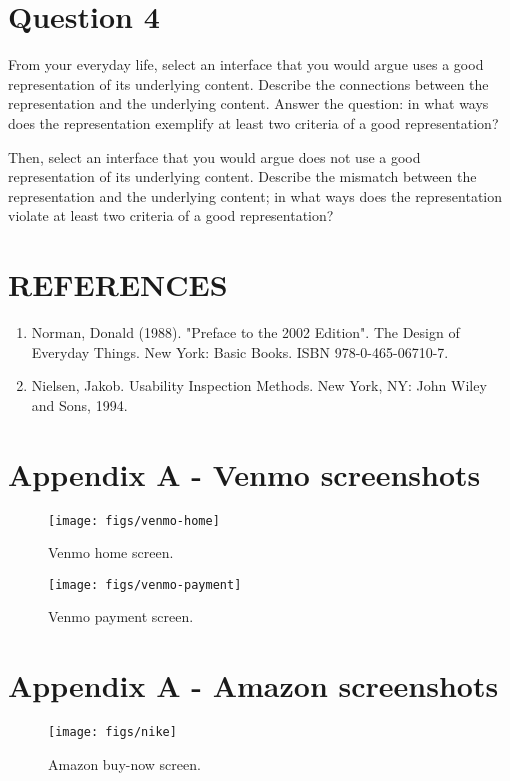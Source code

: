 \section{Question 4}

From your everyday life, select an interface that you would argue uses a good representation of its underlying content. Describe the connections between the representation and the underlying content. Answer the question: in what ways does the representation exemplify at least two criteria of a good representation?

Then, select an interface that you would argue does not use a good representation of its underlying content. Describe the mismatch between the representation and the underlying content; in what ways does the representation violate at least two criteria of a good representation?

\section{REFERENCES}

\begin{enumerate}
\item
  Norman, Donald (1988). "Preface to the 2002 Edition". The Design of Everyday Things. New York: Basic Books. ISBN 978-0-465-06710-7.
\item
  Nielsen, Jakob. Usability Inspection Methods. New York, NY: John Wiley and Sons, 1994.
\end{enumerate}

\section{Appendix A - Venmo screenshots}

\begin{figure}[H]
  \centering
  \texttt{[image: figs/venmo-home]}
  \caption{Venmo home screen.}
  \label{fig::1}
\end{figure}

\begin{figure}[H]
  \centering
  \texttt{[image: figs/venmo-payment]}
  \caption{Venmo payment screen.}
  \label{fig::1}
\end{figure}


\section{Appendix A - Amazon screenshots}

\begin{figure}[H]
  \centering
  \texttt{[image: figs/nike]}
  \caption{Amazon buy-now screen.}
  \label{fig::1}
\end{figure}




